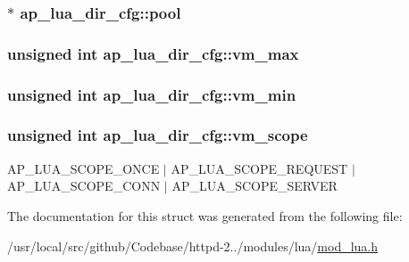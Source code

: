\subsubsection[{\texorpdfstring{pool}{pool}}]{$\ast$ ap\+\_\+lua\+\_\+dir\+\_\+cfg\+::pool}\hypertarget{structap__lua__dir__cfg_ab8944c4e84619d11aa552302c6511a2b}{}\label{structap__lua__dir__cfg_ab8944c4e84619d11aa552302c6511a2b}
\subsubsection[{\texorpdfstring{vm\+\_\+max}{vm_max}}]{\setlength{\rightskip}{0pt plus 5cm}unsigned {\bf int} ap\+\_\+lua\+\_\+dir\+\_\+cfg\+::vm\+\_\+max}\hypertarget{structap__lua__dir__cfg_a8888cae331d4fd4e8aa449f9f52e6c72}{}\label{structap__lua__dir__cfg_a8888cae331d4fd4e8aa449f9f52e6c72}
\subsubsection[{\texorpdfstring{vm\+\_\+min}{vm_min}}]{\setlength{\rightskip}{0pt plus 5cm}unsigned {\bf int} ap\+\_\+lua\+\_\+dir\+\_\+cfg\+::vm\+\_\+min}\hypertarget{structap__lua__dir__cfg_a60cc6a8b476384e3adb941ef9feb1d9f}{}\label{structap__lua__dir__cfg_a60cc6a8b476384e3adb941ef9feb1d9f}
\subsubsection[{\texorpdfstring{vm\+\_\+scope}{vm_scope}}]{\setlength{\rightskip}{0pt plus 5cm}unsigned {\bf int} ap\+\_\+lua\+\_\+dir\+\_\+cfg\+::vm\+\_\+scope}\hypertarget{structap__lua__dir__cfg_af55cc562922b589ae58c1a5ddeba14dc}{}\label{structap__lua__dir__cfg_af55cc562922b589ae58c1a5ddeba14dc}
A\+P\+\_\+\+L\+U\+A\+\_\+\+S\+C\+O\+P\+E\+\_\+\+O\+N\+CE $\vert$ A\+P\+\_\+\+L\+U\+A\+\_\+\+S\+C\+O\+P\+E\+\_\+\+R\+E\+Q\+U\+E\+ST $\vert$ A\+P\+\_\+\+L\+U\+A\+\_\+\+S\+C\+O\+P\+E\+\_\+\+C\+O\+NN $\vert$ A\+P\+\_\+\+L\+U\+A\+\_\+\+S\+C\+O\+P\+E\+\_\+\+S\+E\+R\+V\+ER 

The documentation for this struct was generated from the following file\+:\begin{DoxyCompactItemize}
\item 
/usr/local/src/github/\+Codebase/httpd-\/2../modules/lua/\hyperlink{mod__lua_8h}{mod\+\_\+lua.\+h}\end{DoxyCompactItemize}
